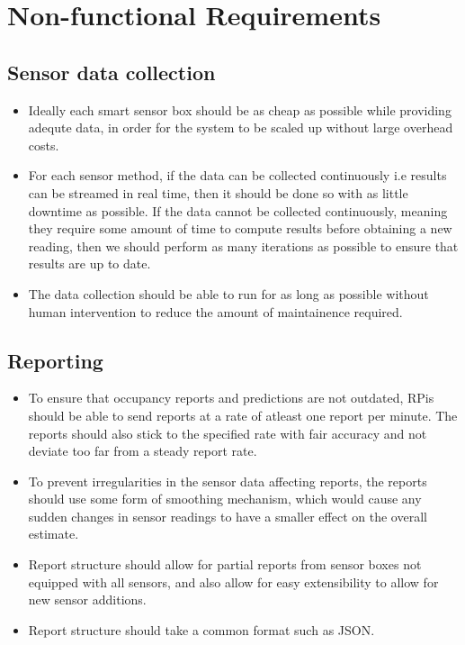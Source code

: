\documentclass{l4proj}
\begin{document}
\section{Non-functional Requirements}
\subsection{Sensor data collection}
\begin{itemize}
  \item Ideally each smart sensor box should be as cheap as possible while providing adequte data, in order for the system to be scaled up without large overhead costs.
  \item For each sensor method, if the data can be collected continuously i.e results can be streamed in real time, then it should be done so with as little downtime as possible. If the data cannot be collected continuously, meaning they require some amount of time to compute results before obtaining a new reading, then we should perform as many iterations as possible to ensure that results are up to date.
  \item The data collection should be able to run for as long as possible without human intervention to reduce the amount of maintainence required.
\end{itemize}

\subsection{Reporting}
\begin{itemize}	
  \item To ensure that occupancy reports and predictions are not outdated, RPis should be able to send reports at a rate of atleast one report per minute. The reports should also stick to the specified rate with fair accuracy and not deviate too far from a steady report rate.
  \item To prevent irregularities in the sensor data affecting reports, the reports should use some form of smoothing mechanism, which would cause any sudden changes in sensor readings to have a smaller effect on the overall estimate.
  \item Report structure should allow for partial reports from sensor boxes not equipped with all sensors, and also allow for easy extensibility to allow for new sensor additions.
  \item Report structure should take a common format such as JSON.
\end{itemize}
\end{document}
